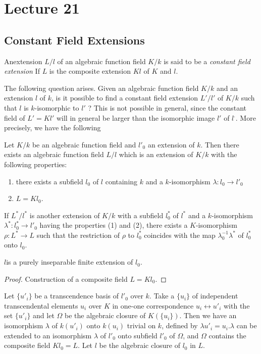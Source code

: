 \chapter{Lecture 21}\label{chap21}

\setcounter{section}{35}
\section{Constant Field Extensions}\label{chap21:sec36}%

An\pageoriginale extension $L/l$ of an algebraic function field $K/k$ is said to be
a \textit{constant field extension} If $L$ is the composite extension
$Kl$ of $K$ and $l$. 

The following question arises. Given an algebraic function field $K/k$
and an extension $l$ of $k$, is it possible to find a constant field
extension $L'/l'$ of $K/k$ such that $l$ is $k$-isomorphic to $l'$ ?
This is not possible in general, since the constant field of $L'=Kl'$
will in general be larger than the isomorphic image $l'$ of
$l^.$. More precisely, we have the following 

\begin{theorem*}%
  Let $K/k$ be an algebraic function field and $l'_0$ an extension of
  $k$. Then there exists an algebraic function field $L/l$ which is an
  extension of $K/k$ with the following properties: 
  \begin{enumerate}[\rm (1)]
  \item there exists a subfield $l_0$ of $l$ containing $k$ and a
    $k$-isomorphism $\lambda : l_0 \to l'_0$ 
  \item $L = Kl_0$. 
  \end{enumerate}
\end{theorem*}

If $L^*/l^*$ is another extension of $K/k$ with a subfield $l^*_0$
of $l^*$ and a $k$-isomorphism $\lambda^* : l^*_0 \to l'_0$ having
the properties (1) and (2), there exists a $K$-isomorphism $\rho :
L^* \to L$ such that the restriction of $\rho$ to $l^*_0$ coincides
with the map $\lambda^{-1}_0 \lambda^*$ of $l^*_0$ onto $l_0$. 

$l$\pageoriginale is a purely inseparable finite extension of $l_0$.

\begin{proof}
  Construction of a composite field $L = Kl_0$.
\end{proof}

Let $\{u'_i\}$ be a transcendence basis of $l'_0$ over $k$. Take a $\{
u_i\}$ of independent transcendental elements $u_i$ over $K$ in
one-one correspondence $u_i \leftrightarrow u'_i$ with the set
$\{u'_i\}$ and let $\Omega$ be the algebraic closure of
$K(\{u_i\})$. Then we have an isomorphism $\lambda$ of $k(u'_i)$ onto
$k(u_i)$ trivial on $k$, defined by $\lambda u'_i = u_i. \lambda$ can
be extended to an isomorphism $\lambda$ of $l'_0$ onto subfield $l'_0$
of $\Omega$, and $\Omega$ contains the composite field $Kl_0 = L$. Let
$l$ be the algebraic closure of $l_0$ in $L$. 

